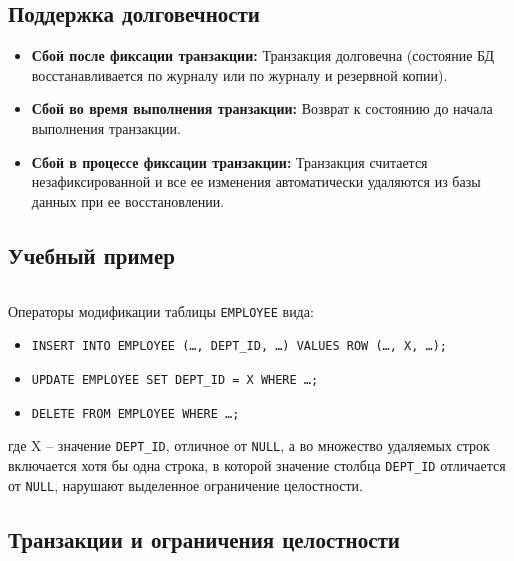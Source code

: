 \documentclass[a4paper,12pt]{article}
\begin{document}
\subsection{Поддержка долговечности}

\begin{itemize}
    \item \textbf{Сбой после фиксации транзакции:} Транзакция долговечна (состояние БД восстанавливается по журналу или по журналу и резервной копии).
    \item \textbf{Сбой во время выполнения транзакции:} Возврат к состоянию до начала выполнения транзакции.
    \item \textbf{Сбой в процессе фиксации транзакции:} Транзакция считается незафиксированной и все ее изменения автоматически удаляются из базы данных при ее восстановлении.
\end{itemize}

\subsection{Учебный пример}

\begin{lstlisting}

\end{lstlisting}

Операторы модификации таблицы \texttt{EMPLOYEE} вида:
\begin{itemize}
    \item \texttt{INSERT INTO EMPLOYEE (…, DEPT\_ID, …) VALUES ROW (…, X, …);}
    \item \texttt{UPDATE EMPLOYEE SET DEPT\_ID = X WHERE …;}
    \item \texttt{DELETE FROM EMPLOYEE WHERE …;}
\end{itemize}
где X – значение \texttt{DEPT\_ID}, отличное от \texttt{NULL}, а во множество удаляемых строк включается хотя бы одна строка, в которой значение столбца \texttt{DEPT\_ID} отличается от \texttt{NULL}, нарушают выделенное ограничение целостности.

\subsection{Транзакции и ограничения целостности}
\end{document}
